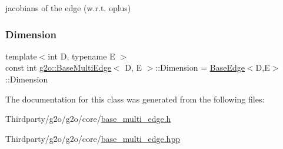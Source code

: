 jacobians of the edge (w.\+r.\+t. oplus) 

\mbox{\label{classg2o_1_1_base_multi_edge_a3c713fe8d1cd161f777625d8e2d5695d}} 
\subsubsection{\texorpdfstring{Dimension}{Dimension}}
{\footnotesize\ttfamily template$<$int D, typename E $>$ \\
const int \mbox{\hyperlink{classg2o_1_1_base_multi_edge}{g2o\+::\+Base\+Multi\+Edge}}$<$ D, E $>$\+::Dimension = \mbox{\hyperlink{classg2o_1_1_base_edge}{Base\+Edge}}$<$D,E$>$\+::Dimension\hspace{0.3cm}{\ttfamily [static]}}



The documentation for this class was generated from the following files\+:\begin{DoxyCompactItemize}
\item 
Thirdparty/g2o/g2o/core/\mbox{\hyperlink{base__multi__edge_8h}{base\+\_\+multi\+\_\+edge.\+h}}\item 
Thirdparty/g2o/g2o/core/\mbox{\hyperlink{base__multi__edge_8hpp}{base\+\_\+multi\+\_\+edge.\+hpp}}\end{DoxyCompactItemize}
